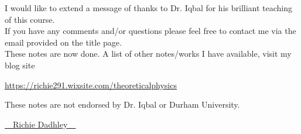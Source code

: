 \documentclass[11pt,oneside]{book}
\theoremstyle{definition} %
\theoremstyle{plain} %
\theoremstyle{remark} %
\theoremstyle{underline}
\begin{document}
I would like to extend a message of thanks to Dr. Iqbal for his brilliant teaching of this course. \\

If you have any comments and/or questions please feel free to contact me via the email provided on the title page. \\

These notes are now done. A list of other notes/works I have available, visit my blog site

\begin{center}
    \href{https://richie291.wixsite.com/theoreticalphysics}{https://richie291.wixsite.com/theoreticalphysics}
\end{center}

These notes are not endorsed by Dr. Iqbal or Durham University.

\vspace{1cm}

\begin{flushright}
    \Huge{{\cursive\setul{0.1ex}{}\ul{~~Richie Dadhley~~}}}
\end{flushright}


\tableofcontents


\mainmatter














% 
% 



%
\end{document}
